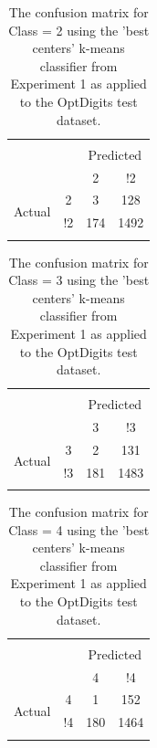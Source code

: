 \documentclass[12pt]{article}
\begin{document}
\begin{table} \centering 
  \caption{The confusion matrix for Class = 2 using the 'best centers' k-means classifier from Experiment 1 as applied to the OptDigits test dataset.} 
  \label{tab:a5} 
\begin{tabular}{lccc} 
\\[-1.8ex]\hline 
\hline \\[-1.8ex] 
\multicolumn{2}{c}{} & \multicolumn{2}{c}{Predicted} \\
\multicolumn{2}{c}{} & 2 & !2\\
\multirow{2}{*}{Actual} & 2 & 3 & 128\\
& !2 & 174 & 1492\\
\hline \\[-1.8ex]
\end{tabular} 
\end{table}

\begin{table} \centering 
  \caption{The confusion matrix for Class = 3 using the 'best centers' k-means classifier from Experiment 1 as applied to the OptDigits test dataset.} 
  \label{tab:a6} 
\begin{tabular}{lccc} 
\\[-1.8ex]\hline 
\hline \\[-1.8ex] 
\multicolumn{2}{c}{} & \multicolumn{2}{c}{Predicted} \\
\multicolumn{2}{c}{} & 3 & !3\\
\multirow{2}{*}{Actual} & 3 & 2 & 131\\
& !3 & 181 & 1483\\
\hline \\[-1.8ex]
\end{tabular} 
\end{table}


\begin{table} \centering 
  \caption{The confusion matrix for Class = 4 using the 'best centers' k-means classifier from Experiment 1 as applied to the OptDigits test dataset.} 
  \label{tab:a7} 
\begin{tabular}{lccc} 
\\[-1.8ex]\hline 
\hline \\[-1.8ex] 
\multicolumn{2}{c}{} & \multicolumn{2}{c}{Predicted} \\
\multicolumn{2}{c}{} & 4 & !4\\
\multirow{2}{*}{Actual} & 4 & 1 & 152\\
& !4 & 180 & 1464\\
\hline \\[-1.8ex]
\end{tabular} 
\end{table}
\end{document}
